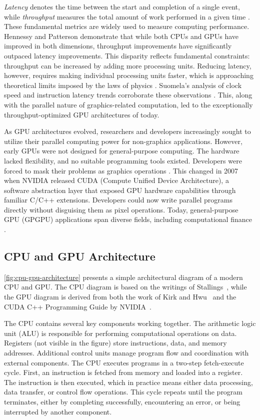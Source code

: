 \documentclass[english,12pt,a4paper,pdftex,sci,utf8]{aaltothesis}
\begin{document}
\emph{Latency} denotes the time between the start and completion of a single event, while \emph{throughput} measures the total amount of work performed in a given time \cite{hennessy2011computer}. These fundamental metrics are widely used to measure computing performance. Hennessy and Patterson \cite{hennessy2011computer} demonstrate that while both CPUs and GPUs have improved in both dimensions, throughput improvements have significantly outpaced latency improvements. This disparity reflects fundamental constraints: throughput can be increased by adding more processing units. Reducing latency, however, requires making individual processing units faster, which is approaching theoretical limits imposed by the laws of physics \cite{hennessy2011computer, sanders2010cuda}. Suomela's analysis of clock speed and instruction latency trends corroborate these observations \cite{suomela_ppc}. This, along with the parallel nature of graphics-related computation, led to the exceptionally throughput-optimized GPU architectures of today.

As GPU architectures evolved, researchers and developers increasingly sought to utilize their parallel computing power for non-graphics applications. However, early GPUs were not designed for general-purpose computing. The hardware lacked flexibility, and no suitable programming tools existed. Developers were forced to mask their problems as graphics operations \cite{sanders2010cuda, kirk2016programming}. This changed in 2007 when NVIDIA released CUDA (Compute Unified Device Architecture), a software abstraction layer that exposed GPU hardware capabilities through familiar C/C++ extensions. Developers could now write parallel programs directly without disguising them as pixel operations. Today, general-purpose GPU (GPGPU) applications span diverse fields, including computational finance \cite{sanders2010cuda, kirk2016programming}.
\clearpage

\subsection{CPU and GPU Architecture}
 \cref{fig:cpu-gpu-architecture} presents a simple architectural diagram of a modern CPU and GPU. The CPU diagram is based on the writings of Stallings~\cite{stallings2011operating}, while the GPU diagram is derived from both the work of Kirk and Hwu~\cite{kirk2016programming} and the CUDA C++ Programming Guide by NVIDIA~\cite{cuda2025guide}.

The CPU contains several key components working together. The arithmetic logic unit (ALU) is responsible for performing computational operations on data. Registers (not visible in the figure) store instructions, data, and memory addresses. Additional control units manage program flow and coordination with external components. The CPU executes programs in a two-step fetch-execute cycle. First, an instruction is fetched from memory and loaded into a register. The instruction is then executed, which in practice means either data processing, data transfer, or control flow operations. This cycle repeats until the program terminates, either by completing successfully, encountering an error, or being interrupted by another component.
\end{document}
